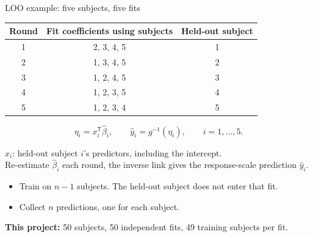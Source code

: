 \documentclass[11pt,aspectratio=169]{beamer}
\begin{document}
\begin{frame}{LOO example: five subjects, five fits}
\renewcommand{\arraystretch}{1.13}
\centering
\begin{tabular}{@{}ccc@{}}
\toprule
\textbf{Round} & \textbf{Fit coefficients using subjects} & \textbf{Held-out subject} \\
\midrule
1 & 2, 3, 4, 5 & 1 \\
2 & 1, 3, 4, 5 & 2 \\
3 & 1, 2, 4, 5 & 3 \\
4 & 1, 2, 3, 5 & 4 \\
5 & 1, 2, 3, 4 & 5 \\
\bottomrule
\end{tabular}

\medskip
\[
  \eta_i = x_i^\mathsf{T}\widehat\beta_i,
  \qquad \widehat y_i = g^{-1}(\eta_i),
  \qquad i = 1,\ldots,5.
\]

\small $x_i$: held-out subject $i$'s predictors, including the intercept.\\
Re-estimate $\widehat\beta_i$ each round, the inverse link gives the response-scale prediction $\widehat y_i$.

\medskip
\raggedright
\begin{itemize}
  \item Train on $n-1$ subjects. The held-out subject does not enter that fit.
  \item Collect $n$ predictions, one for each subject.
\end{itemize}
\textbf{This project:} 50 subjects, 50 independent fits, 49 training subjects per fit.
\end{frame}
\end{document}
